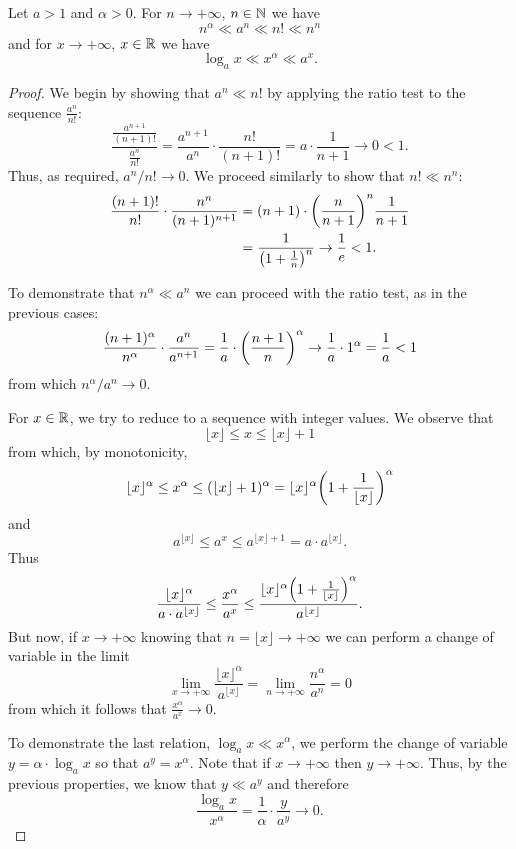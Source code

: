 \begin{theorem}
\label{th:ordine_infinito}%
%
%
\mymark{***}%
Let $a>1$ and $\alpha>0$. For $n\to +\infty$, $n\in{\mathbb N}$
we have
\[
  n^\alpha \ll a^n \ll n! \ll n^n
\]
and for $x\to +\infty$, $x\in {\mathbb R}$ we have 
\[
\log_a x \ll x^\alpha \ll a^x.
\]
\end{theorem}
%
\begin{proof}
\mymark{**}
We begin by showing that $a^n \ll n!$
by applying the ratio test to the sequence $\frac{a^n}{n!}$:
\[
\frac{\displaystyle \frac{a^{n+1}}{(n+1)!}}{\displaystyle \frac{a^n}{n!}}
= \frac{a^{n+1}}{a^n}\cdot \frac{n!}{(n+1)!}
= a \cdot \frac {1}{n + 1} \to 0 < 1.
\]
Thus, as required, $a^n / n! \to 0$.
We proceed similarly to show that $n! \ll n^n$:
\begin{align*}
\frac{(n+1)!}{n!}\cdot \frac{n^n}{(n+1)^{n+1}}
&= (n+1) \cdot {\left( \frac{n}{n+1} \right)}^n \frac {1}{n+1}\\
&= \frac{1}{{\left( 1+\frac 1 n \right)}^n} \to \frac 1 e < 1.
\end{align*}
  
To demonstrate that
$n^\alpha \ll a^n$
we can proceed with the ratio test, as in the previous cases:
\[
\frac{(n+1)^\alpha}{n^\alpha}\cdot \frac{a^n}{a^{n+1}}
= \frac 1 a \cdot {\left( \frac{n+1}{n} \right)}^\alpha \to \frac 1 a \cdot 1^\alpha =
\frac 1 a < 1
\]
from which $n^\alpha / a^n \to 0$.

For $x\in {\mathbb R}$,
we try to reduce to a sequence with integer values.
We observe that
\[
\lfloor x \rfloor
\le x
\le \lfloor x \rfloor + 1
\]
from which, by monotonicity,
\[
\lfloor x \rfloor^\alpha
\le x^\alpha
\le (\lfloor x \rfloor + 1)^\alpha
= \lfloor x \rfloor^\alpha {\left( 1+ \frac{1}{\lfloor x \rfloor} \right)}^\alpha
\]
and
\[
a^{\lfloor x \rfloor}
\le a^{x}
\le a^{\lfloor x \rfloor + 1}
= a \cdot a^{\lfloor x \rfloor}.
\]
Thus
\[
\frac{\lfloor x \rfloor^\alpha}{a \cdot a^{\lfloor x \rfloor}}
\le \frac{x^\alpha}{a^{x}}
\le \frac{\lfloor x \rfloor^\alpha {\left( 1+ \frac{1}{\lfloor x \rfloor} \right)}^\alpha}
    {a^{\lfloor x \rfloor}}.
\]
But now, if $x\to +\infty$ knowing that $n = \lfloor x\rfloor \to +\infty$ 
we can perform a change of variable in the limit
\[
\lim_{x\to +\infty} \frac{\lfloor x \rfloor^\alpha}{a^{\lfloor x \rfloor}} 
= \lim_{n\to+\infty} \frac{n^\alpha}{a^n} = 0
\]
from which it follows that $\frac{x^\alpha}{a^{x}}\to 0$.

To demonstrate the last relation, $\log_a x\ll x^\alpha$,
we perform the change of variable $y = \alpha \cdot \log_a x$
so that $a^y = x^\alpha$.
Note that if $x\to +\infty$
then $y \to +\infty$.
Thus, by the previous properties,
we know that $y \ll a^y$ and therefore
\[
\frac{\log_a x}{x^\alpha}
= \frac{1}{\alpha}\cdot\frac{y}{a^{y}} \to 0.
\]
\end{proof}

